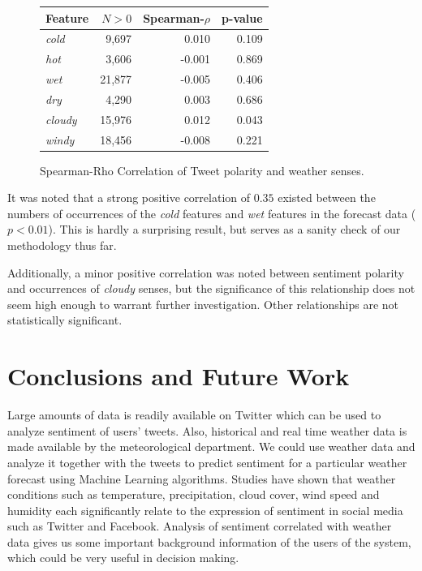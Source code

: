 \documentclass[a4paper,10pt]{article}
\begin{document}
    \begin{figure}
        \begin{tabular}{l | r r r }
        \hline
        \textbf{Feature} & \textbf{$N > 0$} & \textbf{Spearman-$\rho$} & \textbf{p-value} \\
        \hline
        \textit{cold} & 9,697 & 0.010 & 0.109 \\
        \textit{hot} & 3,606 & -0.001 & 0.869 \\
        \textit{wet} & 21,877 & -0.005 & 0.406 \\
        \textit{dry} & 4,290 & 0.003 & 0.686 \\
        \textit{cloudy} & 15,976 & 0.012 & 0.043 \\
        \textit{windy} & 18,456 & -0.008 & 0.221 \\
        \end{tabular}
        \caption{Spearman-Rho Correlation of Tweet polarity and weather senses.}
        \label{fig:stats2}
    \end{figure}
    
    It was noted that a strong positive correlation of $0.35$ existed between the numbers of occurrences of the \textit{cold} features and \textit{wet} features in the forecast data ($p<0.01$). This is hardly a surprising result, but serves as a sanity check of our methodology thus far.

    Additionally, a minor positive correlation was noted between sentiment polarity and occurrences of \textit{cloudy} senses, but the significance of this relationship does not seem high enough to warrant further investigation. Other relationships are not statistically significant.

    \section{Conclusions and Future Work}
    \label{conclusion}
     Large amounts of data is readily available on Twitter which can be used to analyze sentiment of users' tweets. Also, historical and real time weather data is made available by the meteorological department. We could use weather data and analyze it together with the tweets to predict sentiment for a particular weather forecast using Machine Learning algorithms. Studies have shown that weather conditions such as temperature, precipitation, cloud cover, wind speed and humidity each significantly relate to the expression of sentiment in social media such as Twitter and Facebook. Analysis of sentiment correlated with weather data gives us some important background information of the users of the system, which could be very useful in decision making.
\end{document}
